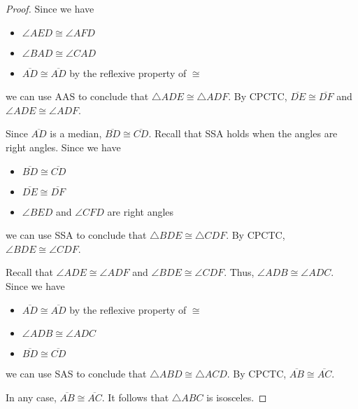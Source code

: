 \documentclass[12pt]{article}
\begin{document}
\begin{proof}
Since we have

\begin{itemize}
\item $\angle AED \cong \angle AFD$
\item $\angle BAD \cong \angle CAD$
\item $\overline{AD} \cong \overline{AD}$ by the reflexive property of $\cong$
\end{itemize}

we can use AAS to conclude that $\triangle ADE \cong \triangle ADF$.  By CPCTC, $\overline{DE} \cong \overline{DF}$ and $\angle ADE \cong \angle ADF$.

Since $\overline{AD}$ is a median, $\overline{BD} \cong \overline{CD}$.  Recall that SSA holds when the angles are right angles.  Since we have

\begin{itemize}
\item $\overline{BD} \cong \overline{CD}$
\item $\overline{DE} \cong \overline{DF}$
\item $\angle BED$ and $\angle CFD$ are right angles
\end{itemize}

we can use SSA to conclude that $\triangle BDE \cong \triangle CDF$.  By CPCTC, $\angle BDE \cong \angle CDF$.

Recall that $\angle ADE \cong \angle ADF$ and $\angle BDE \cong \angle CDF$.  Thus, $\angle ADB \cong \angle ADC$.  Since we have

\begin{itemize}
\item $\overline{AD} \cong \overline{AD}$ by the reflexive property of $\cong$
\item $\angle ADB \cong \angle ADC$
\item $\overline{BD} \cong \overline{CD}$
\end{itemize}

we can use SAS to conclude that $\triangle ABD \cong \triangle ACD$.  By CPCTC, $\overline{AB} \cong \overline{AC}$.

In any case, $\overline{AB} \cong \overline{AC}$.  It follows that $\triangle ABC$ is isosceles.
\end{proof}
\end{document}
